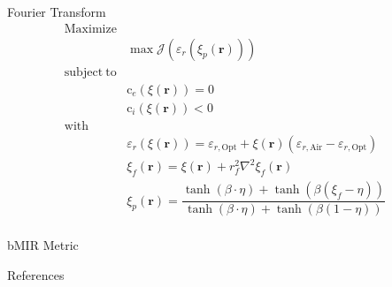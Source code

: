 \begin{frame}[t]
\begin{columns}[t]
\begin{column}{\colwidth}
    \begin{block}{Fourier Transform}   
    \begin{equation}
     \begin{aligned}
       \mathrm{Maximize} &\\
        & \max \mathcal{J}(\varepsilon_r(\xi_p(\bm{r}))) \\
        \mathrm{subject~to} &  \\
        & \mathrm{c}_e(\xi(\bm{r})) = 0\\
        & \mathrm{c}_i(\xi(\bm{r})) < 0\\
         \mathrm{with} &  \\
        &\varepsilon_r(\xi(\bm{r})) = \varepsilon_{r, \mathrm{Opt}} + \xi(\bm{r})\left ( \varepsilon_{r, \mathrm{Air}} - \varepsilon_{r, \mathrm{Opt}} \right ) &\\
        & \xi_f(\mathbf{r}) = \xi(\mathbf{r}) + r^2_f\nabla^2\xi_f(\mathbf{r})& \\
        &  \xi_p(\mathbf{r}) = \dfrac{
        \tanh \left( {\beta \cdot \eta} \right)+ \tanh{ \left( \beta \left( \xi_f - \eta \right) \right) }
        }
        { \tanh{\left( \beta \cdot \eta \right)} + \tanh{\left( \beta \left( 1-\eta \right)\right)} } & \\
    \end{aligned}
    \label{eq:objective_function}
    \end{equation}
    \end{block}

    \begin{block}{bMIR Metric}


    \end{block}
    
    \begin{block}{References}
    
        \nocite{Vaswani2017AttentionNeed}
        \AtNextBibliography{\small}
        \printbibliography
        
    \end{block}
    
\end{column}
\separatorcolumn
\end{columns}
\end{frame}
